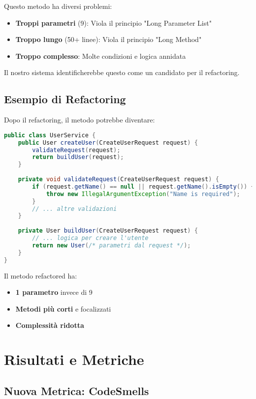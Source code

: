 \documentclass[12pt,a4paper]{article}
\begin{document}
Questo metodo ha diversi problemi:
\begin{itemize}
    \item \textbf{Troppi parametri} (9): Viola il principio "Long Parameter List"
    \item \textbf{Troppo lungo} (50+ linee): Viola il principio "Long Method"
    \item \textbf{Troppo complesso}: Molte condizioni e logica annidata
\end{itemize}

Il nostro sistema identificherebbe questo come un candidato per il refactoring.

\subsection{Esempio di Refactoring}

Dopo il refactoring, il metodo potrebbe diventare:

\begin{lstlisting}[language=Java, caption=Metodo refactored]
public class UserService {
    public User createUser(CreateUserRequest request) {
        validateRequest(request);
        return buildUser(request);
    }
    
    private void validateRequest(CreateUserRequest request) {
        if (request.getName() == null || request.getName().isEmpty()) {
            throw new IllegalArgumentException("Name is required");
        }
        // ... altre validazioni
    }
    
    private User buildUser(CreateUserRequest request) {
        // ... logica per creare l'utente
        return new User(/* parametri dal request */);
    }
}
\end{lstlisting}

Il metodo refactored ha:
\begin{itemize}
    \item \textbf{1 parametro} invece di 9
    \item \textbf{Metodi più corti} e focalizzati
    \item \textbf{Complessità ridotta}
\end{itemize}

\section{Risultati e Metriche}

\subsection{Nuova Metrica: CodeSmells}
\end{document}
